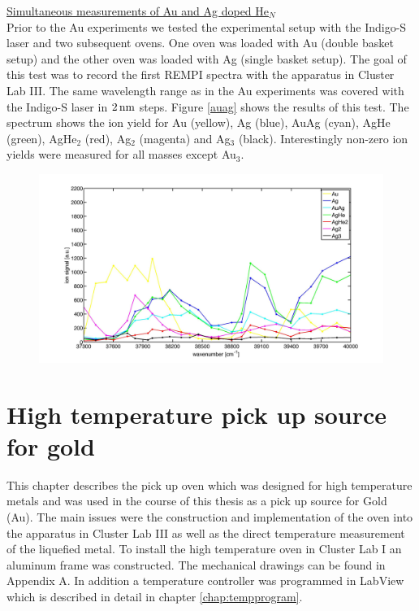 \documentclass[parskip,12pt,headsepline,a4paper] {scrbook}
\begin{document}
\newpage

\underline{Simultaneous measurements of Au and Ag doped He$_N$} \\
Prior to the Au experiments we tested the experimental setup with the Indigo-S laser and two subsequent ovens. One oven was loaded with Au (double basket setup) and the other oven was loaded with Ag (single basket setup). The goal of this test was to record the first REMPI spectra with the apparatus in Cluster Lab III. The same wavelength range as in the Au experiments was covered with the Indigo-S laser in $\unit[2]{nm}$ steps. Figure \ref{auag} shows the results of this test. The spectrum shows the ion yield for Au (yellow), Ag (blue), AuAg (cyan), AgHe (green), AgHe$_2$ (red), Ag$_2$ (magenta) and Ag$_3$ (black). Interestingly non-zero ion yields were measured for all masses except Au$_3$.

\begin{figure}[ht]
\centerline{
\includegraphics[width=19cm]{./results/au_ag_spec.jpg}}
\end{figure}


\chapter{High temperature pick up source for gold}
\label{chap:goldoven}
This chapter describes the pick up oven which was designed for high temperature metals and was used in the course of this thesis as a pick up source for Gold (Au). The main issues were the construction and implementation of the oven into the apparatus in Cluster Lab III as well as the direct temperature measurement of the liquefied metal. To install the high temperature oven in Cluster Lab I an aluminum frame was constructed. The mechanical drawings can be found in Appendix A. In addition a temperature controller was programmed in LabView which is described in detail in chapter \ref{chap:tempprogram}.
\end{document}
